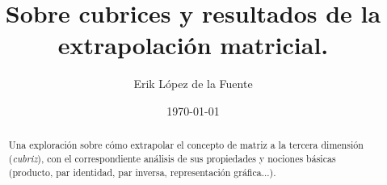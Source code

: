 \documentclass[a4paper, titlepage]{article}
\title{Sobre cubrices y resultados de la extrapolación matricial.}
\author{Erik López de la Fuente}
\date{\today}
\begin{document}
\maketitle

\begin{abstract}
	Una exploración sobre cómo extrapolar el concepto de matriz a la tercera dimensión (\textit{cubriz}), con el correspondiente análisis de sus propiedades y nociones básicas (producto, par identidad, par inversa, representación gráfica...).
\end{abstract}

\tableofcontents
\newpage









\newpage


\end{document}
